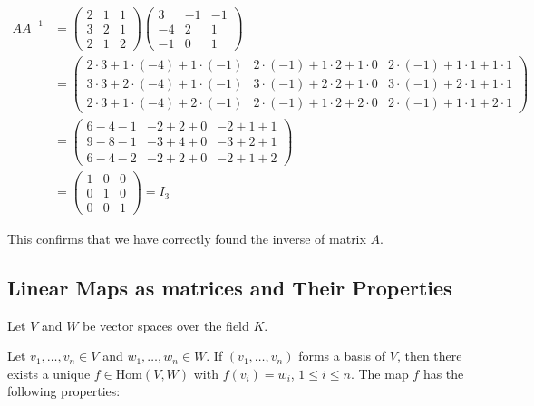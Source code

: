 \begin{align*}
    AA^{-1} &= 
    \begin{pmatrix}
    2 & 1 & 1 \\
    3 & 2 & 1 \\
    2 & 1 & 2
    \end{pmatrix}
    \begin{pmatrix}
    3 & -1 & -1 \\
    -4 & 2 & 1 \\
    -1 & 0 & 1
    \end{pmatrix} \\
    &= 
    \begin{pmatrix}
    2 \cdot 3 + 1 \cdot (-4) + 1 \cdot (-1) & 2 \cdot (-1) + 1 \cdot 2 + 1 \cdot 0 & 2 \cdot (-1) + 1 \cdot 1 + 1 \cdot 1 \\
    3 \cdot 3 + 2 \cdot (-4) + 1 \cdot (-1) & 3 \cdot (-1) + 2 \cdot 2 + 1 \cdot 0 & 3 \cdot (-1) + 2 \cdot 1 + 1 \cdot 1 \\
    2 \cdot 3 + 1 \cdot (-4) + 2 \cdot (-1) & 2 \cdot (-1) + 1 \cdot 2 + 2 \cdot 0 & 2 \cdot (-1) + 1 \cdot 1 + 2 \cdot 1
    \end{pmatrix} \\
    &= 
    \begin{pmatrix}
    6 - 4 - 1 & -2 + 2 + 0 & -2 + 1 + 1 \\
    9 - 8 - 1 & -3 + 4 + 0 & -3 + 2 + 1 \\
    6 - 4 - 2 & -2 + 2 + 0 & -2 + 1 + 2
    \end{pmatrix} \\
    &= 
    \begin{pmatrix}
    1 & 0 & 0 \\
    0 & 1 & 0 \\
    0 & 0 & 1
    \end{pmatrix} = I_3
\end{align*}

This confirms that we have correctly found the inverse of matrix \(A\).

\subsection{Linear Maps as matrices and Their Properties}

Let \(V\) and \(W\) be vector spaces over the field \(K\).
\vspace{\baselineskip}

Let \(v_1, \dots, v_n \in V\) and \(w_1, \dots, w_n \in W\). If \((v_1, \dots, v_n)\) 
forms a basis of \(V\), then there exists a unique \(f \in \text{Hom}(V, W)\) with 
\(f(v_i) = w_i\), \(1 \leq i \leq n\). The map \(f\) has the following properties:

